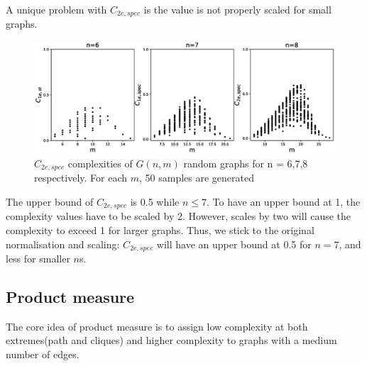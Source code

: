 \documentclass[12pt]{article}
\begin{document}
\par
A unique problem with $C_{2e,spec}$ is the value is not properly scaled for small graphs.

\begin{figure}[ht]
    \includegraphics[width = \textwidth]{c2espec.eps}
    \caption{$C_{2e,spec}$ complexities of $G(n,m)$ random graphs for n = 6,7,8 respectively. For each $m$, 50 samples are generated}
    \label{fig:c2espec}
    \centering
\end{figure}
\par
The upper bound of $C_{2e,spec}$ is 0.5 while $ n\leq7 $. To have an upper bound at 1, the complexity values have to be scaled by 2. However, scales by two will cause the complexity to exceed 1 for larger graphs. Thus, we stick to the original normalisation and scaling: $C_{2e,spec}$ will have an upper bound at 0.5 for $n=7$, and less for smaller $n$s.

\subsection{Product measure}
The core idea of product measure is to assign low complexity at both extremes(path and cliques) and higher complexity to graphs with a medium number of edges.
\end{document}

